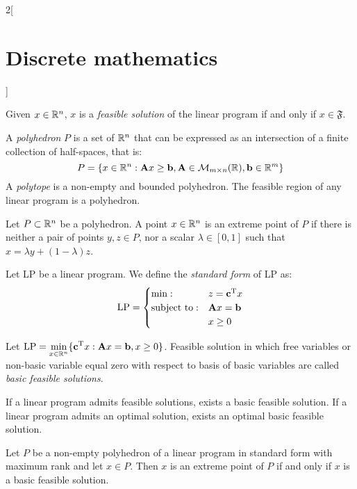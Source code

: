 \documentclass[../../../main.tex]{subfiles}
\begin{document}
\begin{multicols}{2}[\section{Discrete mathematics}]
\begin{definition}
  \end{definition}
  \begin{proposition}
    Given $x\in\mathbb{R} ^n$, $x$ is a \emph{feasible solution} of the linear program if and only if $x\in\mathfrak{F}$.
  \end{proposition}
  \begin{definition}
    A \emph{polyhedron} $P$ is a set of $\mathbb{R} ^n$ that can be expressed as an intersection of a finite collection of half-spaces, that is: $$P=\{x\in\mathbb{R} ^n:\boldsymbol{\mathrm{A}}x\geq \boldsymbol{\mathrm{b}}, \boldsymbol{\mathrm{A}}\in\mathcal{M}_{m\times n}(\mathbb{R} ),\boldsymbol{\mathrm{b}}\in\mathbb{R} ^m\}$$ A \emph{polytope} is a non-empty and bounded polyhedron. The feasible region of any linear program is a polyhedron.
  \end{definition}
  \begin{definition}
    Let $P\subset\mathbb{R} ^n$ be a polyhedron. A point $x\in\mathbb{R} ^n$ is an extreme point of $P$ if there is neither a pair of points $y,z\in P$, nor a scalar $\lambda\in[0,1]$ such that $x=\lambda y+(1-\lambda)z$.
  \end{definition}
  \begin{definition}
    Let LP be a linear program. We define the \emph{standard form} of LP as:
    $$\text{LP}=
      \begin{cases}
        \min:              & z=\vb{\boldsymbol{\mathrm{c}}}^{\mathrm{T}}x \\
        \text{subject to}: & \boldsymbol{\mathrm{A}}x=\boldsymbol{\mathrm{b}}        \\
                           & x\geq 0
      \end{cases}$$
  \end{definition}
  \begin{definition}
    Let $\displaystyle \text{LP}=\min_{x\in\mathbb{R} ^n}\{\vb{\boldsymbol{\mathrm{c}}}^{\mathrm{T}}x:\boldsymbol{\mathrm{A}}x=\boldsymbol{\mathrm{b}},x\geq 0\}$. Feasible solution in which free variables or non-basic variable equal zero with respect to basis of basic variables are called \emph{basic feasible solutions}.
  \end{definition}
  \begin{proposition}
    If a linear program admits feasible solutions, exists a basic feasible solution. If a linear program admits an optimal solution, exists an optimal basic feasible solution.
  \end{proposition}
  \begin{theorem}
    Let $P$ be a non-empty polyhedron of a linear program in standard form with maximum rank and let $x\in P$. Then $x$ is an extreme point of $P$ if and only if $x$ is a basic feasible solution.
  \end{theorem}

\end{multicols}
\end{document}
